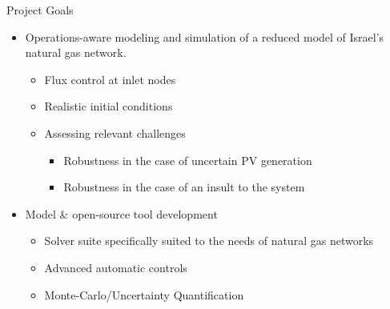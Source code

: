 \begin{frame}{Project Goals}
  \begin{itemize}
  \item Operations-aware modeling and simulation of a reduced model of Israel's natural gas network.
    \begin{itemize}
    \item Flux control at inlet nodes
    \item Realistic initial conditions
    \item Assessing relevant challenges
      \begin{itemize}
      \item Robustness in the case of uncertain PV generation
      \item Robustness in the case of an insult to the system
      \end{itemize}
    \end{itemize}

  \item Model \& open-source tool development
    \begin{itemize}
    \item Solver suite specifically suited to the needs of natural gas networks
    \item Advanced automatic controls
    \item Monte-Carlo/Uncertainty Quantification
    \end{itemize}
  \end{itemize}
\end{frame}


